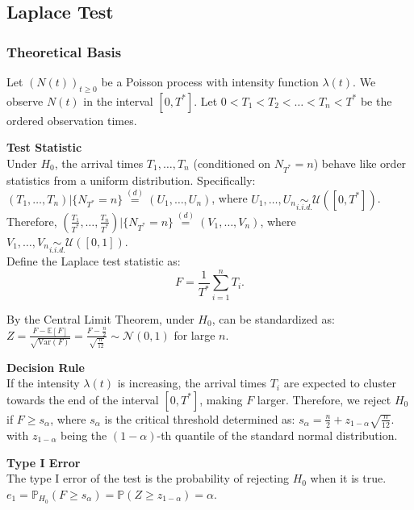 \documentclass{journalstyle}
\begin{document}
\subsection{Laplace Test}

\subsubsection{Theoretical Basis}

Let $(N(t))_{t \geq 0}$ be a Poisson process with intensity function $\lambda(t)$.
We observe $N(t)$ in the interval $[0, T^*]$.
Let $0 < T_1 < T_2 < \ldots < T_n < T^*$ be the ordered observation times.

\noindent\textbf{Test Statistic} \\
Under $H_0$, the arrival times $T_1, \ldots, T_n$ (conditioned on $N_{T^*} = n$) behave like order statistics from a uniform distribution.
Specifically: \\
$(T_1, \ldots, T_n) | \{N_{T^*} = n\} \overset{(d)}{=} (U_1, \ldots, U_n)$, where $U_1, \ldots, U_n \underset{i.i.d.}{\sim} \mathcal{U}([0, T^*])$. \\
Therefore, $(\frac{T_1}{T^*}, \ldots, \frac{T_n}{T^*}) | \{N_{T^*} = n\} \overset{(d)}{=} (V_1, \ldots, V_n)$, where $V_1, \ldots, V_n \underset{i.i.d.}{\sim} \mathcal{U}([0, 1])$. \\
Define the Laplace test statistic as: 
\begin{equation}
    F = \frac{1}{T^*} \sum_{i=1}^n T_i.
    \label{eq:laplace_test_statistic}
\end{equation}

By the Central Limit Theorem, under $H_0$,  can be standardized as: 
$Z = \frac{F - \mathbb{E}[F]}{\sqrt{\text{Var}(F)}} = \frac{F - \frac{n}{2}}{\sqrt{\frac{n}{12}}} \sim \mathcal{N}(0, 1)$
for large $n$.

\noindent\textbf{Decision Rule} \\
If the intensity $\lambda(t)$ is increasing, the arrival times $T_i$ are expected to cluster towards the end of the interval $[0, T^*]$, making $F$ larger.
Therefore, we reject $H_0$ if $F \geq s_{\alpha}$, where $s_{\alpha}$ is the critical threshold determined as: $s_{\alpha} = \frac{n}{2} + z_{1 - \alpha} \sqrt{\frac{n}{12}}$. \\
with $z_{1 - \alpha}$ being the $(1 - \alpha)$-th quantile of the standard normal distribution.

\noindent\textbf{Type I Error} \\
The type I error of the test is the probability of rejecting $H_0$ when it is true. \\
$e_1 = \mathbb{P}_{H_0}(F \geq s_{\alpha}) = \mathbb{P}(Z \geq z_{1 - \alpha}) = \alpha$.
\end{document}
